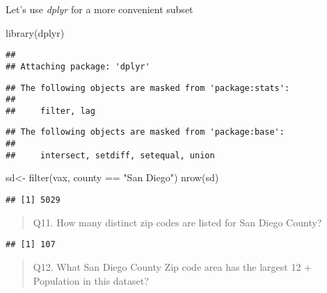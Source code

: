 \documentclass[
]{article}
\newenvironment{Shaded}{\begin{snugshade}}{\end{snugshade}}
\newcommand{\FunctionTok}[1]{\textcolor[rgb]{0.00,0.00,0.00}{#1}}
\newcommand{\NormalTok}[1]{#1}
\newcommand{\OtherTok}[1]{\textcolor[rgb]{0.56,0.35,0.01}{#1}}
\newcommand{\SpecialCharTok}[1]{\textcolor[rgb]{0.00,0.00,0.00}{#1}}
\newcommand{\StringTok}[1]{\textcolor[rgb]{0.31,0.60,0.02}{#1}}
\begin{document}
Let's use \emph{dplyr} for a more convenient subset

\begin{Shaded}
\begin{Highlighting}[]
\FunctionTok{library}\NormalTok{(dplyr)}
\end{Highlighting}
\end{Shaded}

\begin{verbatim}
## 
## Attaching package: 'dplyr'
\end{verbatim}

\begin{verbatim}
## The following objects are masked from 'package:stats':
## 
##     filter, lag
\end{verbatim}

\begin{verbatim}
## The following objects are masked from 'package:base':
## 
##     intersect, setdiff, setequal, union
\end{verbatim}

\begin{Shaded}
\begin{Highlighting}[]
\NormalTok{sd}\OtherTok{\textless{}{-}} \FunctionTok{filter}\NormalTok{(vax, county }\SpecialCharTok{==} \StringTok{"San Diego"}\NormalTok{)}
\FunctionTok{nrow}\NormalTok{(sd)}
\end{Highlighting}
\end{Shaded}

\begin{verbatim}
## [1] 5029
\end{verbatim}

\begin{quote}
Q11. How many distinct zip codes are listed for San Diego County?
\end{quote}

\begin{Shaded}
\end{Shaded}

\begin{verbatim}
## [1] 107
\end{verbatim}

\begin{quote}
Q12. What San Diego County Zip code area has the largest 12 + Population
in this dataset?
\end{quote}
\end{document}
